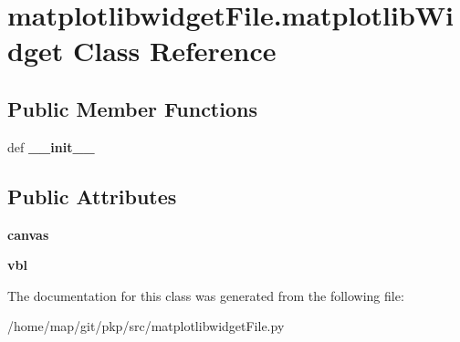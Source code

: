 \hypertarget{classmatplotlibwidgetFile_1_1matplotlibWidget}{\section{matplotlibwidget\-File.\-matplotlib\-Widget \-Class \-Reference}
\label{classmatplotlibwidgetFile_1_1matplotlibWidget}
}
\subsection*{\-Public \-Member \-Functions}
\begin{DoxyCompactItemize}
\item 
\hypertarget{classmatplotlibwidgetFile_1_1matplotlibWidget_a1bc590494420336b0cfbeb6c9cc1ba74}{def {\bfseries \-\_\-\-\_\-init\-\_\-\-\_\-}}\label{classmatplotlibwidgetFile_1_1matplotlibWidget_a1bc590494420336b0cfbeb6c9cc1ba74}

\end{DoxyCompactItemize}
\subsection*{\-Public \-Attributes}
\begin{DoxyCompactItemize}
\item 
\hypertarget{classmatplotlibwidgetFile_1_1matplotlibWidget_ab7ca5a7b88f2e7114d4fa0995573bf5c}{{\bfseries canvas}}\label{classmatplotlibwidgetFile_1_1matplotlibWidget_ab7ca5a7b88f2e7114d4fa0995573bf5c}

\item 
\hypertarget{classmatplotlibwidgetFile_1_1matplotlibWidget_a04af3d7b648193fe4a92156a72f4a650}{{\bfseries vbl}}\label{classmatplotlibwidgetFile_1_1matplotlibWidget_a04af3d7b648193fe4a92156a72f4a650}

\end{DoxyCompactItemize}


\-The documentation for this class was generated from the following file\-:\begin{DoxyCompactItemize}
\item 
/home/map/git/pkp/src/matplotlibwidget\-File.\-py\end{DoxyCompactItemize}
